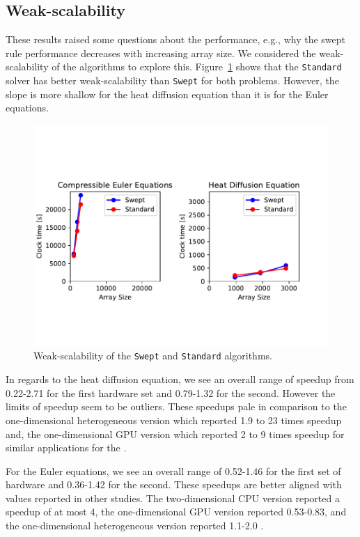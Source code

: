 \documentclass[review]{elsarticle}
\def\Swept{\texttt{Swept}}
\def\Standard{\texttt{Standard}}
\begin{document}
\subsection{Weak-scalability}
These results raised some questions about the performance, e.g., why the swept rule performance decreases with increasing array size. We considered the weak-scalability of the algorithms to explore this. Figure~\ref{fig:scalability} shows that the \Standard{} solver has better weak-scalability than \Swept{} for both problems. However, the slope is more shallow for the heat diffusion equation than it is for the Euler equations. 
\begin{figure}
    \centering
    \includegraphics[scale=1, trim={5cm 2cm 5cm 3.5cm}]{figs/weakScalability.pdf}
    \caption{Weak-scalability of the \Swept{} and \Standard{} algorithms.}
    \label{fig:scalability}
\end{figure}

In regards to the heat diffusion equation, we see an overall range of speedup from 0.22-2.71 for the first hardware set and 0.79-1.32 for the second. However the limits of speedup seem to be outliers. These speedups pale in comparison to the one-dimensional heterogeneous version which reported 1.9 to 23 times speedup and, the one-dimensional GPU version which reported 2 to 9 times speedup for similar applications for the  \cite{Magee2018AcceleratingDecomposition,Magee2020ApplyingSystems}. 

For the Euler equations, we see an overall range of 0.52-1.46 for the first set of hardware and 0.36-1.42 for the second. These speedups are better aligned with values reported in other studies. The two-dimensional CPU version reported a speedup of at most 4, the one-dimensional GPU version reported 0.53-0.83, and the one-dimensional heterogeneous version reported 1.1-2.0 \cite{Alhubail2018ThePDEs,Magee2018AcceleratingDecomposition,Magee2020ApplyingSystems}.
\end{document}
